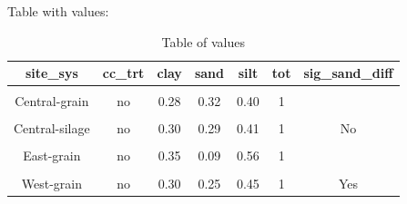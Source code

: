 \documentclass[
]{article}
\begin{document}
Table with values:

\begin{table}[H]

\caption{\label{tab:texture2}Table of values}
\centering
\begin{tabular}[t]{ccccccc}
\toprule
site\_sys & cc\_trt & clay & sand & silt & tot & sig\_sand\_diff\\
\midrule
\cellcolor{gray!6}{} & \cellcolor{gray!6}{cc} & \cellcolor{gray!6}{0.28} & \cellcolor{gray!6}{0.32} & \cellcolor{gray!6}{0.40} & \cellcolor{gray!6}{1} & \cellcolor{gray!6}{}\\

\multirow{-2}{*}{\centering\arraybackslash Central-grain} & no & 0.28 & 0.32 & 0.40 & 1 & \\

\cellcolor{gray!6}{} & \cellcolor{gray!6}{cc} & \cellcolor{gray!6}{0.29} & \cellcolor{gray!6}{0.30} & \cellcolor{gray!6}{0.41} & \cellcolor{gray!6}{1} & \cellcolor{gray!6}{}\\

\multirow{-2}{*}{\centering\arraybackslash Central-silage} & no & 0.30 & 0.29 & 0.41 & 1 & \multirow{-4}{*}{\centering\arraybackslash No}\\
\cmidrule{1-7}
\cellcolor{gray!6}{} & \cellcolor{gray!6}{cc} & \cellcolor{gray!6}{0.32} & \cellcolor{gray!6}{0.12} & \cellcolor{gray!6}{0.56} & \cellcolor{gray!6}{1} & \cellcolor{gray!6}{}\\

\multirow{-2}{*}{\centering\arraybackslash East-grain} & no & 0.35 & 0.09 & 0.56 & 1 & \\

\cellcolor{gray!6}{} & \cellcolor{gray!6}{cc} & \cellcolor{gray!6}{0.27} & \cellcolor{gray!6}{0.31} & \cellcolor{gray!6}{0.42} & \cellcolor{gray!6}{1} & \cellcolor{gray!6}{}\\

\multirow{-2}{*}{\centering\arraybackslash West-grain} & no & 0.30 & 0.25 & 0.45 & 1 & \multirow{-4}{*}{\centering\arraybackslash Yes}\\
\bottomrule
\end{tabular}
\end{table}
\end{document}
